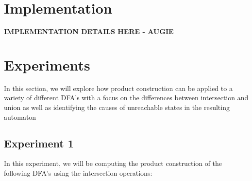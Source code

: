 \documentclass[conference]{IEEEtran}
\begin{document}
\section{Implementation}
\textbf{IMPLEMENTATION DETAILS HERE - AUGIE}

\section{Experiments}
In this section, we will explore how product construction can be applied to a variety of different DFA's with a focus on the differences between intersection and union as well as identifying the causes of unreachable states in the resulting automaton
\subsection{Experiment 1}
In this experiment, we will be computing the product construction of the following DFA's using the intersection operations:
\end{document}
